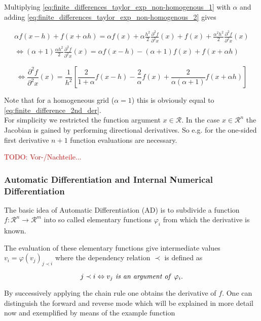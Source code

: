\documentclass{scrartcl}[12pt, halfparskip]
\newcommand{\todo}[1]{\textcolor{red}{TODO: #1}}
\begin{document}
Multiplying \eqref{eq:finite_differences_taylor_exp_non-homogenous_1} with $\alpha$ and adding \eqref{eq:finite_differences_taylor_exp_non-homogenous_2} gives

\begin{align}
	\alpha f(x-h) + f(x+\alpha h) = \alpha f(x) + \alpha \frac{h^2}{2} \frac{\partial^2 f}{\partial^2 x}(x) + f(x) + \frac{\alpha^2 h^2}{2} \frac{\partial^2 f}{\partial^2 x}(x) \\
	\Leftrightarrow (\alpha+1) \frac{\alpha h^2}{2} \frac{\partial^2 f}{\partial^2 x}(x) = \alpha f(x-h) - (\alpha+1) f(x) + f(x+\alpha h)
\end{align}

\begin{equation}
	\Leftrightarrow \frac{\partial^2 f}{\partial^2 x}(x) = \frac{1}{h^2} \left[ \frac{2}{1+\alpha} f(x-h) - \frac{2}{\alpha} f(x) + \frac{2}{\alpha (\alpha+1)} f(x+\alpha h) \right]
\end{equation}

Note that for a homogeneous grid ($\alpha=1$) this is obviously equal to \eqref{eq:finite_difference_2nd_der}. \\

For simplicity we restricted the function argument $x \in \mathcal{R}$. In the case $x \in \mathcal{R}^n$ the Jacobian is gained by performing directional derivatives. So e.g. for the one-sided first derivative $n+1$ function evaluations are necessary.

\todo{Vor-/Nachteile...} 



\subsubsection{Automatic Differentiation and Internal Numerical Differentiation}
The basic idea of Automatic Differentiation (AD) is to subdivide a function $f: \mathcal{R}^n \rightarrow \mathcal{R}^m$ into so called elementary functions $\varphi_i$ from which the derivative is known. 

The evaluation of these elementary functions give intermediate values $v_i = \varphi(v_j)_{j \prec i}$ where the dependency relation $\prec$ is defined as

\begin{equation}
	j \prec i \Leftrightarrow v_j \text{\textit{ is an argument of }} \varphi_i.
\end{equation}

By successively applying the chain rule one obtains the derivative of $f$.
One can distinguish the forward and reverse mode which will be explained in more detail now and exemplified by means of the example function
\end{document}
